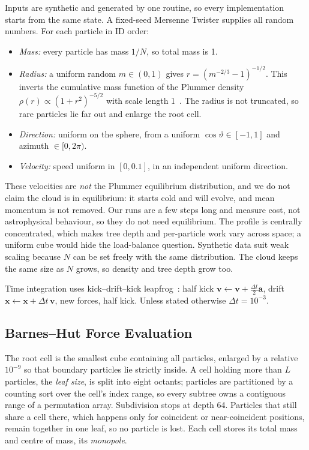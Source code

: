 \documentclass[10pt,a4paper,twocolumn,twoside]{rho-class/rho}
\begin{document}
Inputs are synthetic and generated by one routine, so every implementation starts from the same state. A fixed-seed Mersenne Twister supplies all random numbers. For each particle in ID order:
\begin{itemize}[noitemsep]
\item \emph{Mass:} every particle has mass $1/N$, so total mass is 1.
\item \emph{Radius:} a uniform random $m \in (0,1)$ gives $r = (m^{-2/3}-1)^{-1/2}$. This inverts the cumulative mass function of the Plummer density $\rho(r) \propto (1+r^2)^{-5/2}$ with scale length 1~\cite{Plummer1911,Aarseth1974}. The radius is not truncated, so rare particles lie far out and enlarge the root cell.
\item \emph{Direction:} uniform on the sphere, from a uniform $\cos\vartheta \in [-1,1]$ and azimuth $\in [0,2\pi)$.
\item \emph{Velocity:} speed uniform in $[0, 0.1]$, in an independent uniform direction.
\end{itemize}
These velocities are \emph{not} the Plummer equilibrium distribution, and we do not claim the cloud is in equilibrium: it starts cold and will evolve, and mean momentum is not removed. Our runs are a few steps long and measure cost, not astrophysical behaviour, so they do not need equilibrium. The profile is centrally concentrated, which makes tree depth and per-particle work vary across space; a uniform cube would hide the load-balance question. Synthetic data suit weak scaling because $N$ can be set freely with the same distribution. The cloud keeps the same size as $N$ grows, so density and tree depth grow too.

Time integration uses kick--drift--kick leapfrog~\cite{Verlet1967}: half kick $\mathbf{v} \leftarrow \mathbf{v} + \tfrac{\Delta t}{2}\mathbf{a}$, drift $\mathbf{x} \leftarrow \mathbf{x} + \Delta t\,\mathbf{v}$, new forces, half kick. Unless stated otherwise $\Delta t = 10^{-3}$.

\subsection{Barnes--Hut Force Evaluation}
The root cell is the smallest cube containing all particles, enlarged by a relative $10^{-9}$ so that boundary particles lie strictly inside. A cell holding more than $L$ particles, the \emph{leaf size}, is split into eight octants; particles are partitioned by a counting sort over the cell's index range, so every subtree owns a contiguous range of a permutation array. Subdivision stops at depth 64. Particles that still share a cell there, which happens only for coincident or near-coincident positions, remain together in one leaf, so no particle is lost. Each cell stores its total mass and centre of mass, its \emph{monopole}.
\end{document}
